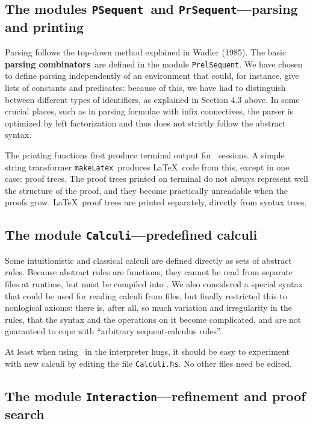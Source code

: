 \subsection{The modules {\tt PSequent}\ and {\tt PrSequent}---parsing and printing}

Parsing follows the top-down method explained in Wadler (1985). The basic 
{\bf parsing combinators}\ are defined in the module {\tt PrelSequent}.
We have chosen to define parsing independently of an environment that could, for
instance, give lists of constants and predicates: because of this, we have had
to distinguish between different types of identifiers, as explained in 
Section 4.3 above. In some crucial places, such as in parsing formulae with infix
connectives, the parser is optimized by left factorization and thus does not 
strictly follow the abstract syntax.

The printing functions first produce terminal output for \PESC\ sessions.
A simple string transformer {\tt makeLatex}\ produces \LaTeX\ code from this,
except in one case: proof trees. The proof trees printed on terminal do not
always represent well the structure of the proof, and they become practically
unreadable when the proofs grow. \LaTeX\ proof trees are printed separately, 
directly from syntax trees.


\subsection{The module {\tt Calculi}---predefined calculi}

Some intuitionistic and classical calculi are defined directly as
sets of abstract rules. Because abstract rules are functions, they cannot
be read from separate files at runtime, but must be compiled into \PESC. 
We also considered a special syntax that could be used for reading calculi
from files, but finally restricted this to nonlogical axioms: there is,
after all, so much variation and irregularity in the rules, that the
syntax and the operations on it become complicated, and are not
guaranteed to cope with ``arbitrary sequent-calculus rules''.

At least when using \PESC\ in the interpreter hugs, it should be easy to 
experiment with new calculi by editing the file {\tt Calculi.hs}. No other
files need be edited.


\subsection{The module {\tt Interaction}---refinement and proof search}

